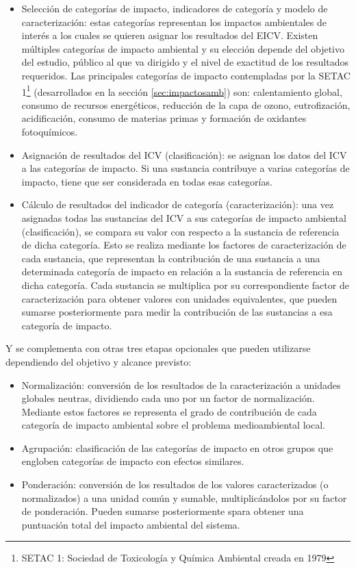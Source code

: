 \begin{itemize}
  \item Selección de categorías de impacto, indicadores de categoría y modelo de caracterización: estas categorías representan los impactos ambientales de interés a los cuales se quieren asignar los resultados del EICV. Existen múltiples categorías de impacto ambiental y su elección depende del objetivo del estudio, público al que va dirigido y el nivel de exactitud de los resultados requeridos. Las principales categorías de impacto contempladas por la SETAC 1\footnote{SETAC 1: Sociedad de Toxicología y Química Ambiental creada en 1979} (desarrollados en la sección \ref{sec:impactosamb}) son: calentamiento global, consumo de recursos energéticos, reducción de la capa de ozono, eutrofización, acidificación, consumo de materias primas y formación de oxidantes fotoquímicos.
  \item Asignación de resultados del ICV (clasificación): se asignan los datos del ICV a las categorías de impacto. Si una sustancia contribuye a varias categorías de impacto, tiene que ser considerada en todas esas categorías.
  \item Cálculo de resultados del indicador de categoría (caracterización): una vez asignadas todas las sustancias del ICV a sus categorías de impacto ambiental (clasificación), se compara su valor con respecto a la sustancia de referencia de dicha categoría. Esto se realiza mediante los factores de caracterización de cada sustancia, que representan la contribución de una sustancia a una determinada categoría de impacto en relación a la sustancia de referencia en dicha categoría. Cada sustancia se multiplica por su correspondiente factor de caracterización para obtener valores con unidades equivalentes, que pueden sumarse posteriormente para medir la contribución de las sustancias a esa categoría de impacto.
\end{itemize}

Y se complementa con otras tres etapas opcionales que pueden utilizarse dependiendo del objetivo y alcance previsto:

\begin{itemize}
  \item Normalización: conversión de los resultados de la caracterización a unidades globales neutras, dividiendo cada uno por un factor de normalización. Mediante estos factores se representa el grado de contribución de cada categoría de impacto ambiental sobre el problema medioambiental local.
  \item Agrupación: clasificación de las categorías de impacto en otros grupos que engloben categorías de impacto con efectos similares.
  \item Ponderación: conversión de los resultados de los valores caracterizados (o normalizados) a una unidad común y sumable, multiplicándolos por su factor de ponderación. Pueden sumarse posteriormente spara obtener una puntuación total del impacto ambiental del sistema.
\end{itemize}


